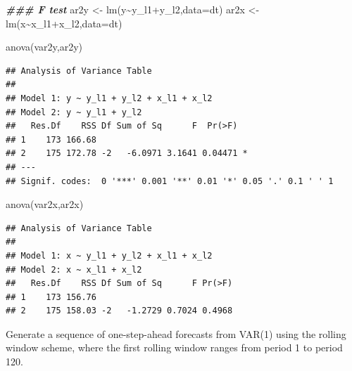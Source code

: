 \documentclass[
  12pt,
  oneside]{book}
\newenvironment{Shaded}{\begin{snugshade}}{\end{snugshade}}
\newcommand{\AttributeTok}[1]{\textcolor[rgb]{0.77,0.63,0.00}{#1}}
\newcommand{\DocumentationTok}[1]{\textcolor[rgb]{0.56,0.35,0.01}{\textbf{\textit{#1}}}}
\newcommand{\FunctionTok}[1]{\textcolor[rgb]{0.00,0.00,0.00}{#1}}
\newcommand{\NormalTok}[1]{#1}
\newcommand{\OtherTok}[1]{\textcolor[rgb]{0.56,0.35,0.01}{#1}}
\newcommand{\SpecialCharTok}[1]{\textcolor[rgb]{0.00,0.00,0.00}{#1}}
\begin{document}
\begin{Shaded}
\begin{Highlighting}[]
\DocumentationTok{\#\#\# F test}
\NormalTok{ar2y }\OtherTok{\textless{}{-}} \FunctionTok{lm}\NormalTok{(y}\SpecialCharTok{\textasciitilde{}}\NormalTok{y\_l1}\SpecialCharTok{+}\NormalTok{y\_l2,}\AttributeTok{data=}\NormalTok{dt)}
\NormalTok{ar2x }\OtherTok{\textless{}{-}} \FunctionTok{lm}\NormalTok{(x}\SpecialCharTok{\textasciitilde{}}\NormalTok{x\_l1}\SpecialCharTok{+}\NormalTok{x\_l2,}\AttributeTok{data=}\NormalTok{dt)}

\FunctionTok{anova}\NormalTok{(var2y,ar2y)}
\end{Highlighting}
\end{Shaded}

\begin{verbatim}
## Analysis of Variance Table
## 
## Model 1: y ~ y_l1 + y_l2 + x_l1 + x_l2
## Model 2: y ~ y_l1 + y_l2
##   Res.Df    RSS Df Sum of Sq      F  Pr(>F)  
## 1    173 166.68                              
## 2    175 172.78 -2   -6.0971 3.1641 0.04471 *
## ---
## Signif. codes:  0 '***' 0.001 '**' 0.01 '*' 0.05 '.' 0.1 ' ' 1
\end{verbatim}

\begin{Shaded}
\begin{Highlighting}[]
\FunctionTok{anova}\NormalTok{(var2x,ar2x)}
\end{Highlighting}
\end{Shaded}

\begin{verbatim}
## Analysis of Variance Table
## 
## Model 1: x ~ y_l1 + y_l2 + x_l1 + x_l2
## Model 2: x ~ x_l1 + x_l2
##   Res.Df    RSS Df Sum of Sq      F Pr(>F)
## 1    173 156.76                           
## 2    175 158.03 -2   -1.2729 0.7024 0.4968
\end{verbatim}

Generate a sequence of one-step-ahead forecasts from VAR(1) using the rolling window scheme, where the first rolling window ranges from period 1 to period 120.
\end{document}
